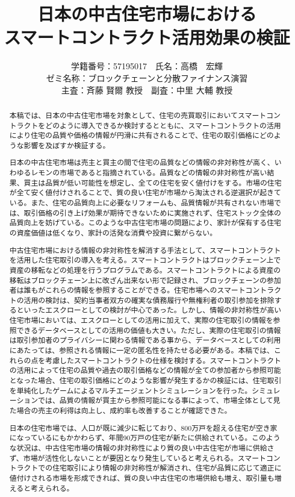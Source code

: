 \documentclass[a4paper,fontsize=11pt,report,notitlepage,line_length=38zw,number_of_lines=40,dvipdfmx]{jlreq}
\title{日本の中古住宅市場における\\スマートコントラクト活用効果の検証}
\author{
学籍番号：57195017　氏名：高橋　宏輝
\\ゼミ名称：ブロックチェーンと分散ファイナンス演習
\\主査：斉藤 賢爾 教授　副査：中里 大輔 教授}
\begin{document}
\date{}
\maketitle
\begin{abstract}
本稿では、日本の中古住宅市場を対象として、住宅の売買取引においてスマートコントラクトをどのように導入できるか検討するとともに、スマートコントラクトの活用により住宅の品質や価格の情報が円滑に共有されることで、住宅の取引価格にどのような影響を及ぼすか検証する。

日本の中古住宅市場は売主と買主の間で住宅の品質などの情報の非対称性が高く、いわゆるレモンの市場であると指摘されている。品質などの情報の非対称性が高い結果、買主は品質が低い可能性を想定し、全ての住宅を安く値付けをする。市場の住宅が全て安く値付けされることで、質の良い住宅が市場から淘汰される逆選択が起きている。また、住宅の品質向上に必要なリフォームも、品質情報が共有されない市場では、取引価格の引き上げ効果が期待できないために実施されず、住宅ストック全体の品質向上を妨げている。このような中古住宅市場の問題により、家計が保有する住宅の資産価値は低くなり、家計の活発な消費や投資に繋がらない。

中古住宅市場における情報の非対称性を解消する手法として、スマートコントラクトを活用した住宅取引の導入を考える。スマートコントラクトはブロックチェーン上で資産の移転などの処理を行うプログラムである。スマートコントラクトによる資産の移転はブロックチェーン上に改ざん出来ない形で記録され、ブロックチェーンの参加者は誰もがこれらの情報を参照することができる。住宅市場へのスマートコントラクトの活用の検討は、契約当事者双方の確実な債務履行や無権利者の取引参加を排除するといったエスクローとしての検討が中心であった。しかし、情報の非対称性が高い住宅市場においては、エスクローとしての活用に加えて、実際の住宅取引の情報を参照できるデータベースとしての活用の価値も大きい。ただし、実際の住宅取引の情報は取引参加者のプライバシーに関わる情報である事から、データベースとしての利用にあたっては、参照される情報に一定の匿名性を持たせる必要がある。本稿では、これらの点を考慮したスマートコントラクトの仕様を検討する。スマートコントラクトの活用によって住宅の品質や過去の取引価格などの情報が全ての参加者から参照可能となった場合、住宅の取引価格にどのような影響が発生するかの検証には、住宅取引を単純化したゲームによるマルチエージェントシミュレーションを行った。シミュレーションでは、品質の情報が買主から参照可能になる事によって、市場全体として見た場合の売主の利得は向上し、成約率も改善することが確認できた。

日本の住宅市場では、人口が既に減少に転じており、800万戸を超える住宅が空き家になっているにもかかわらず、年間90万戸の住宅が新たに供給されている。このような状況は、中古住宅市場の情報の非対称性により質の良い中古住宅が市場に供給さず、市場が活性化しないことが要因となり発生していると考えられる。スマートコントラクトでの住宅取引により情報の非対称性が解消され、住宅が品質に応じて適正に値付けされる市場を形成できれば、質の良い中古住宅の市場供給も増え、取引量も増えると考えられる。

\end{abstract}
\end{document}
